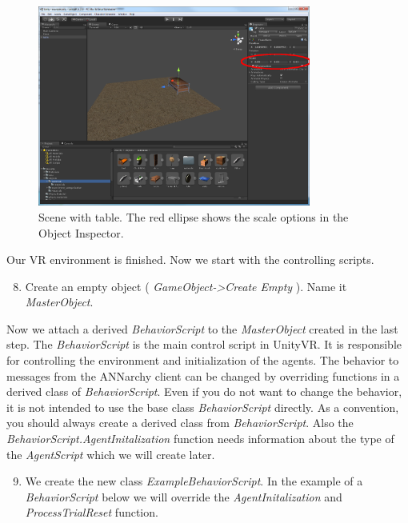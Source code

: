 \documentclass[10pt,final]{scrreprt}
\begin{document}
\begin{figure}[h]
\begin{center}
\includegraphics[width=0.80\textwidth]{images/scenetable.png}
\end{center}
\caption{Scene with table. The red ellipse shows the scale options in the Object Inspector.}
\label{imgscenetable}
\end{figure}

Our VR environment is finished. Now we start with the controlling scripts.

\begin{enumerate}
\setcounter{enumi}{7}
\item Create an empty object ( \emph{GameObject->Create Empty} ). Name it \emph{MasterObject}.
\end{enumerate}


Now we attach a derived \emph{BehaviorScript} to the \emph{MasterObject} created in the last step.
The \emph{BehaviorScript} is the main control script in UnityVR. It is responsible for controlling the environment and initialization of the agents. The behavior to messages from the ANNarchy client can be changed by overriding functions in a derived class of \emph{BehaviorScript}. Even if you do not want to change the behavior, it is not intended to use the base class \emph{BehaviorScript} directly. As a convention, you should  always create a derived class from \emph{BehaviorScript}. Also the \emph{BehaviorScript.AgentInitalization} function needs information about the type of the \emph{AgentScript} which we will create later. 

\begin{enumerate}
\setcounter{enumi}{8}
\item We create the new class \emph{ExampleBehaviorScript}. In the example of a \emph{BehaviorScript} below we will override the \emph{AgentInitalization} and \emph{ProcessTrialReset} function. 
\end{enumerate}
\end{document}
